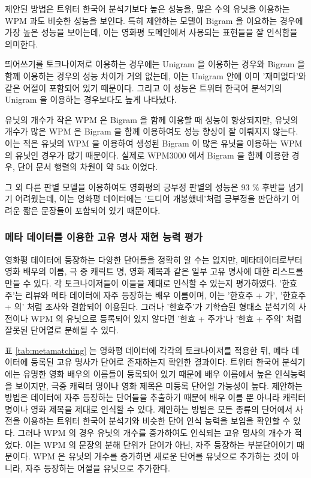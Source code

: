 \documentclass[11pt]{article}
\begin{document}
제안된 방법은 트위터 한국어 분석기보다 높은 성능을, 많은 수의 유닛을 이용하는 WPM 과도 비슷한 성능을 보인다.
특히 제안하는 모델이 Bigram 을 이요하는 경우에 가장 높은 성능을 보이는데, 이는 영화평 도메인에서 사용되는 표현들을 잘 인식함을 의미한다.

띄어쓰기를 토크나이저로 이용하는 경우에는 Unigram 을 이용하는 경우와 Bigram 을 함께 이용하는 경우의 성능 차이가 거의 없는데, 이는 Unigram 안에 이미 '재미없다'와 같은 어절이 포함되어 있기 때문이다.
그리고 이 성능은 트위터 한국어 분석기의 Unigram 을 이용하는 경우보다도 높게 나타났다.

유닛의 개수가 작은 WPM 은 Bigram 을 함께 이용할 때 성능이 향상되지만, 유닛의 개수가 많은 WPM 은 Bigram 을 함께 이용하여도 성능 향상이 잘 이뤄지지 않는다.
이는 적은 유닛의 WPM 을 이용하여 생성된 Bigram 이 많은 유닛을 이용하는 WPM 의 유닛인 경우가 많기 때문이다.
실제로 WPM3000 에서 Bigram 을 함께 이용한 경우, 단어 문서 행렬의 차원이 약 54k 이었다.

그 외 다른 판별 모델을 이용하여도 영화평의 긍부정 판별의 성능은 93 \% 후반을 넘기기 어려웠는데, 이는 영화평 데이터에는 '드디어 개봉했네'처럼 긍부정을 판단하기 어려운 짧은 문장들이 포함되어 있기 때문이다.


\subsubsection{메타 데이터를 이용한 고유 명사 재현 능력 평가}
영화평 데이터에 등장하는 다양한 단어들을 정확히 알 수는 없지만, 메타데이터로부터 영화 배우의 이름, 극 중 캐릭트 명, 영화 제목과 같은 일부 고유 명사에 대한 리스트를 만들 수 있다.
각 토크나이저들이 이들을 제대로 인식할 수 있는지 평가하였다.
'한효주'는 리뷰와 메타 데이터에 자주 등장하는 배우 이름이며, 이는 '한효주 + 가', '한효주 + 의' 처럼 조사와 결합되어 이용된다.
그러나 '한효주'가 기학습된 형태소 분석기의 사전이나 WPM 의 유닛으로 등록되어 있지 않다면 '한효 + 주가'나 '한효 + 주의' 처럼 잘못된 단어열로 분해될 수 있다.

표 \ref{tab:metamatching} 는 영화평 데이터에 각각의 토크나이저를 적용한 뒤, 메타 데이터에 등록된 고유 명사가 단어로 존재하는지 확인한 결과이다.
트위터 한국어 분석기에는 유명한 영화 배우의 이름들이 등록되어 있기 때문에 배우 이름에서 높은 인식능력을 보이지만, 극중 캐릭터 명이나 영화 제목은 미등록 단어일 가능성이 높다.
제안하는 방법은 데이터에 자주 등장하는 단어들을 추출하기 때문에 배우 이름 뿐 아니라 캐릭터 명이나 영화 제목을 제대로 인식할 수 있다.
제안하는 방법은 모든 종류의 단어에서 사전을 이용하는 트위터 한국어 분석기와 비슷한 단어 인식 능력을 보임을 확인할 수 있다.
그러나 WPM 의 경우 유닛의 개수를 증가하여도 인식되는 고유 명사의 개수가 적었다.
이는 WPM 의 문장의 분해 단위가 단어가 아닌, 자주 등장하는 부분단어이기 때문이다.
WPM 은 유닛의 개수를 증가하면 새로운 단어를 유닛으로 추가하는 것이 아니라, 자주 등장하는 어절을 유닛으로 추가한다.
\end{document}
